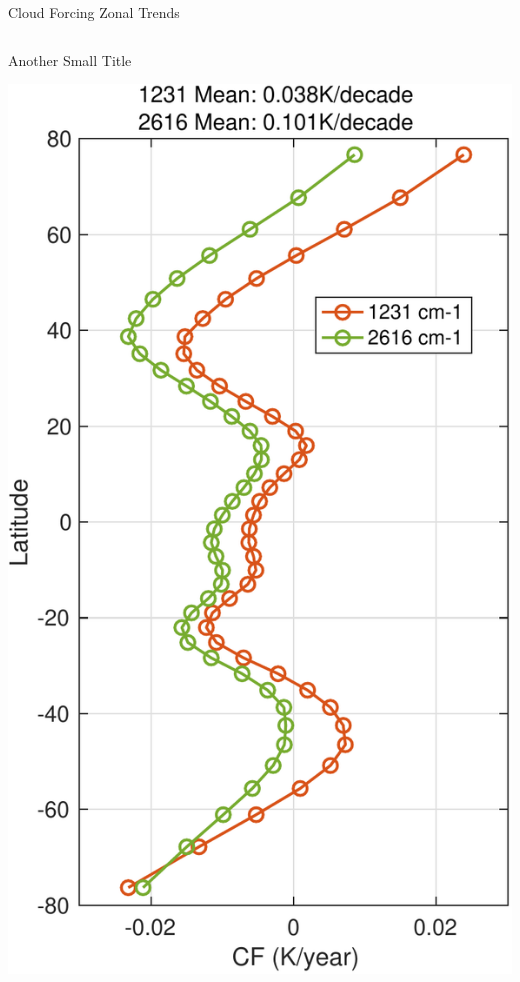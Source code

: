 \documentclass[10pt,t]{beamer}
\begin{document}
\begin{frame}[label={sec:orgd0b9c54}]{Cloud Forcing Zonal Trends}
\begin{columns}
\begin{column}{0.33\columnwidth}
\begin{block}{\footnotesize Another Small Title}
\vspace{-0.1in}
\begin{center}
\includegraphics[width=\linewidth]{./Figs/Pdf/new_trend_rand_stats_1231_and_2161_era_clr_minus_obs_smoothed_with_2616_labelled.pdf}
\end{center}
\end{block}
\end{column}
\end{columns}
\end{frame}
\end{document}
